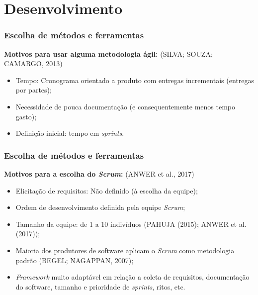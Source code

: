 \documentclass[xcolor=table]{beamer}
\begin{document}
\section{Desenvolvimento}
\begin{frame}
    \frametitle{Escolha de métodos e ferramentas}
    \textbf{Motivos para usar alguma metodologia ágil:} (SILVA; SOUZA; CAMARGO, 2013)
    \begin{itemize}
        \item Tempo: Cronograma orientado a produto com entregas incrementais (entregas por partes); %
        \item Necessidade de pouca documentação (e consequentemente menos tempo gasto); 
        \item Definição inicial: tempo em \textit{sprints}.
    \end{itemize}
    
\end{frame}

\begin{frame}
 \frametitle{Escolha de métodos e ferramentas}
    \textbf{Motivos para a escolha do \textit{Scrum}:} (ANWER et al., 2017)
    \begin{itemize}
        \item Elicitação de requisitos: Não definido (à escolha da equipe); %
        \item Ordem de desenvolvimento definida pela equipe \textit{Scrum}; %
        \item Tamanho da equipe: de 1 a 10 indivíduos (PAHUJA (2015); ANWER et al. (2017)); %
        \item Maioria dos produtores de software aplicam o \textit{Scrum} como metodologia padrão (BEGEL; NAGAPPAN, 2007);
        \item \textit{Framework} muito adaptável em relação a coleta de requisitos, documentação do software, tamanho e prioridade de \textit{sprints}, ritos, etc.  
    \end{itemize}
\end{frame}
\end{document}
